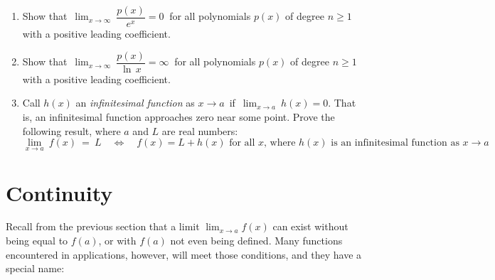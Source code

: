 {\begin{enumerate}[\bfseries 1.]
 \begin{enumerate}[\bfseries (a)]
  \item Evaluate $\displaystyle\lim_{\beta \to 1-}~\gamma~$. What is the
  physical interpretation of this limit?
  \item Suppose an astronaut and his twin just turned 30 years old when the
  astronaut leaves earth on a high-speed journey through space. Upon returning
  to earth the astronaut is 35 and his twin is 70. At roughly what fraction of
  the speed of light must the astronaut have been traveling?
 \end{enumerate}
 \item Show that $\,\displaystyle\lim_{x \to \infty} ~\dfrac{p(x)}{e^x} = 0~$
 for all polynomials $p(x)$ of degree $n \ge 1$ with a positive leading
 coefficient.
 \item Show that $\,\displaystyle\lim_{x \to \infty} ~\dfrac{p(x)}{\ln\,x} = \infty~$
 for all polynomials $p(x)$ of degree $n \ge 1$ with a positive leading
 coefficient.
 \item Call $h(x)$ an
 \emph{infinitesimal function} as
 $x \to a\,$ if $\,\displaystyle\lim_{x \to a} ~h(x) = 0$. That is, an
 infinitesimal function approaches zero near some point. Prove the following
 result, where $a$ and $L$ are real numbers:
\[
\lim_{x \to a}~f(x) ~=~ L \quad\Leftrightarrow\quad f(x) = L + h(x) \text{ for all $x$, where $h(x)$ is an
infinitesimal function as $x \to a$}
\]
\end{enumerate}}
\newpage
\section{Continuity}\label{sec:continuity}
Recall from the previous section that a limit $\lim_{x \to a} f(x)$ can exist
without being equal to $f(a)$, or with $f(a)$ not even being defined. Many
functions encountered in applications, however, will meet those conditions, and
they have a special name:

